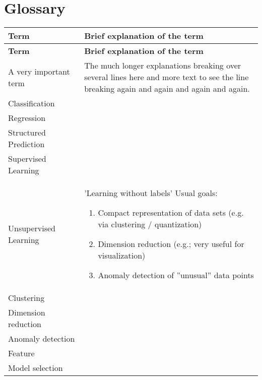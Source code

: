 \documentclass[main]{subfiles}
\begin{document}
\section{Glossary}
\renewcommand{\arraystretch}{1.5}


\begin{longtable}{p{0.3\linewidth} p{0.7\linewidth}}
\hline \textbf{Term} & \textbf{Brief explanation of the term}\\ \hline
\endfirsthead

\hline \textbf{Term} & \textbf{Brief explanation of the term}\\ \hline\hline
\endhead
A very important term & The much longer explanations breaking over several lines here and more text to see the line breaking again and again and again and again.\\
Classification &  \\

Regression &  \\

Structured Prediction &  \\

Supervised Learning &  \\

Unsupervised Learning & 'Learning without labels' \newline
Usual goals:\newline
\begin{enumerate}
\item Compact representation of data sets (e.g. via clustering / quantization)
\item Dimension reduction (e.g.; very useful for visualization)
\item Anomaly detection of ''unusual'' data points
\end{enumerate} \\

Clustering & \\

Dimension reduction & \\

Anomaly detection & \\

Feature & \\

Model selection & \\


\end{longtable}
\end{document}
